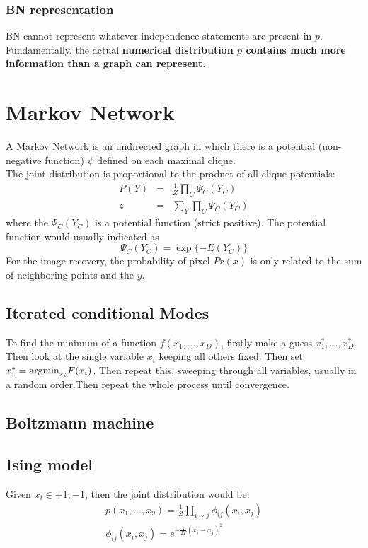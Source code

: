 \documentclass[12pt,a4paper]{article}
\begin{document}
\subsubsection*{BN representation}
BN cannot represent whatever independence statements are present in $p$.\\
Fundamentally, the actual \textbf{numerical distribution $p$ contains much more information than a graph can represent}.

\section*{Markov Network}
A Markov Network is an undirected graph in which there is a potential (non-negative function) $\psi$ defined on each maximal clique.\\
The joint distribution is proportional to the product of all clique potentials:
\begin{eqnarray*}
P(Y) &=& \frac{1}{Z}\prod_{C}\Psi_C(Y_C) \\
z &=& \sum_Y\prod_{C}\Psi_C(Y_C)
\end{eqnarray*}
where the $\Psi_C(Y_C)$ is a potential function (strict positive). The potential function would usually indicated as 
$$
\Psi_C(Y_C) = \exp\{-E(Y_C)\}
$$
For the image recovery, the probability of pixel $Pr(x)$ is only related to the  sum of neighboring points and the $y$.
\subsection*{Iterated conditional Modes}
To find the minimum of a function $f(x_1,\ldots,x_D)$, firstly make a guess $x_1^*,\ldots,x_D^*$. Then look at the single variable $x_i$ keeping all others fixed. Then set $x_i^*={\rm argmin}_{x_i}F(x_i)$.
Then repeat this, sweeping through all variables, usually in a random order.Then repeat the whole process until convergence.
\subsection*{Boltzmann machine}

\subsection*{Ising model}
Given $x_i\in {+1,-1}$, then the joint distribution would be:
\begin{eqnarray*}
p(x_1,\ldots,x_9)=\frac{1}{Z}\prod_{i\sim j}\phi_{ij}(x_i,x_j)\\
\phi_{ij}(x_i,x_j) = e^{-\frac{1}{2T}(x_i-x_j)^2}
\end{eqnarray*}
\end{document}
